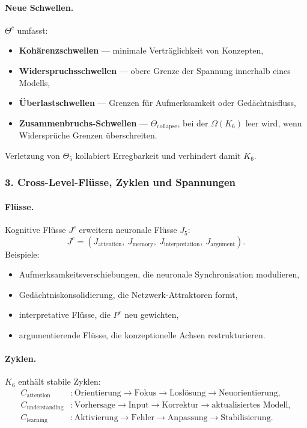 \paragraph{Neue Schwellen.}
$\Theta^{c}$ umfasst:
\begin{itemize}
  \item \textbf{Kohärenzschwellen} — minimale Verträglichkeit von Konzepten,
  \item \textbf{Widerspruchsschwellen} — obere Grenze der Spannung innerhalb
        eines Modells,
  \item \textbf{Überlastschwellen} — Grenzen für Aufmerksamkeit oder Gedächtnisfluss,
  \item \textbf{Zusammenbruchs-Schwellen} — $\Theta_{\mathrm{collapse}}$, bei der
        $\Omega(K_6)$ leer wird, wenn Widersprüche Grenzen überschreiten.
\end{itemize}

Verletzung von $\Theta_5$ kollabiert Erregbarkeit und verhindert damit $K_6$.

\subsubsection{3. Cross-Level-Flüsse, Zyklen und Spannungen}

\paragraph{Flüsse.}
Kognitive Flüsse $J^{c}$ erweitern neuronale Flüsse $J_5$:
\[
J^{c} = (J_{\mathrm{attention}},\ J_{\mathrm{memory}},\
        J_{\mathrm{interpretation}},\ J_{\mathrm{argument}}).
\]
Beispiele:
\begin{itemize}
  \item Aufmerksamkeitsverschiebungen, die neuronale Synchronisation modulieren,
  \item Gedächtniskonsolidierung, die Netzwerk-Attraktoren formt,
  \item interpretative Flüsse, die $P^{c}$ neu gewichten,
  \item argumentierende Flüsse, die konzeptionelle Achsen restrukturieren.
\end{itemize}

\paragraph{Zyklen.}
$K_6$ enthält stabile Zyklen:
\begin{align*}
C_{\mathrm{attention}} &: \text{Orientierung} \rightarrow \text{Fokus}
    \rightarrow \text{Loslösung} \rightarrow \text{Neuorientierung},\\[4pt]
C_{\mathrm{understanding}} &: \text{Vorhersage} \rightarrow \text{Input}
    \rightarrow \text{Korrektur} \rightarrow \text{aktualisiertes Modell},\\[4pt]
C_{\mathrm{learning}} &: \text{Aktivierung} \rightarrow \text{Fehler}
    \rightarrow \text{Anpassung} \rightarrow \text{Stabilisierung}.
\end{align*}

